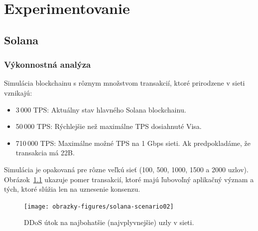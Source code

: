\begin{table}[H]
	\caption{Porovnanie vlastností troch najrozsiahlejších simulátorov.}
	\label{tab:cmp-sim-props}
\end{table}

\chapter{Experimentovanie}

\section{Solana}

\subsection{Výkonnostná analýza}
Simulácia blockchainu s rôznym množstvom transakcií, ktoré prirodzene v sieti vznikajú:
\begin{itemize}
	\item 3\,000 TPS: Aktuálny stav hlavného Solana blockchainu.
	\item 50\,000 TPS: Rýchlejšie než maximálne TPS dosiahnuté Visa.
	\item 710\,000 TPS: Maximálne možné TPS na 1 Gbps sieti. Ak predpokladáme, že transakcia má 22B.
\end{itemize}
Simulácia je opakovaná pre rôzne veľkú sieť (100, 500, 1000, 1500 a 2000 uzlov). Obrázok~\ref{img:solana-scenario01} ukazuje pomer transakcií, ktoré majú ľubovoľný aplikačný význam a tých, ktoré slúžia len na uznesenie konsenzu.
\begin{figure}[H]
	\centering
	\texttt{[image: obrazky-figures/solana-scenario02]}
	\caption{DDoS útok na najbohatšie (najvplyvnejšie) uzly v sieti.}
	\label{img:solana-scenario01}
\end{figure}

